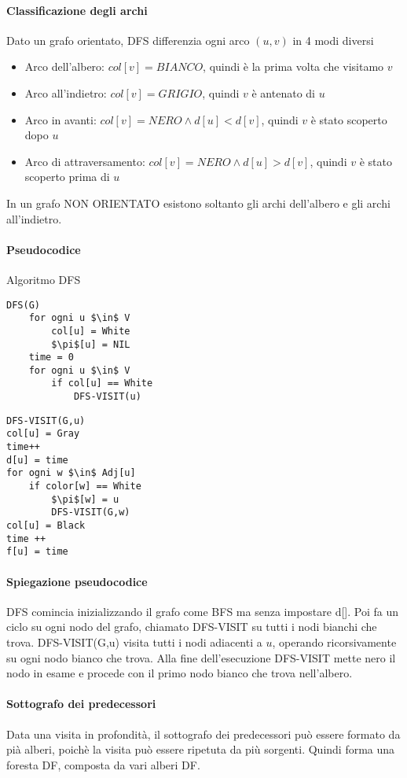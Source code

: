 \documentclass[12pt, a4paper, openany]{book}
\begin{document}
\paragraph{Classificazione degli archi}
Dato un grafo orientato, DFS differenzia ogni arco $(u,v)$ in 4 modi diversi
\begin{itemize}
    \item Arco dell'albero: $col[v] = BIANCO$, quindi è la prima volta che visitamo $v$
    \item Arco all'indietro: $col[v] = GRIGIO$, quindi $v$ è antenato di $u$
    \item Arco in avanti: $col[v] = NERO \land d[u] < d[v]$, quindi $v$ è stato scoperto dopo $u$
    \item Arco di attraversamento: $col[v] = NERO \land d[u] > d[v]$, quindi $v$ è stato scoperto prima di $u$
\end{itemize}
In un grafo NON ORIENTATO esistono soltanto gli archi dell'albero e gli archi all'indietro.

\paragraph{Pseudocodice} Algoritmo DFS
\begin{lstlisting}[mathescape=true]
DFS(G)
    for ogni u $\in$ V
        col[u] = White
        $\pi$[u] = NIL
    time = 0
    for ogni u $\in$ V
        if col[u] == White
            DFS-VISIT(u)
\end{lstlisting}
\begin{lstlisting}[mathescape=true]
DFS-VISIT(G,u)
col[u] = Gray
time++
d[u] = time
for ogni w $\in$ Adj[u]
    if color[w] == White
        $\pi$[w] = u
        DFS-VISIT(G,w)
col[u] = Black
time ++
f[u] = time    
\end{lstlisting}

\paragraph{Spiegazione pseudocodice}
DFS comincia inizializzando il grafo come BFS ma senza impostare d[].
Poi fa un ciclo su ogni nodo del grafo, chiamato DFS-VISIT su tutti i nodi bianchi che trova.
DFS-VISIT(G,u) visita tutti i nodi adiacenti a $u$, operando ricorsivamente su ogni nodo bianco che trova.
Alla fine dell'esecuzione DFS-VISIT mette nero il nodo in esame e procede con il primo nodo bianco che trova nell'albero.


\paragraph{Sottografo dei predecessori}
Data una visita in profondità, il sottografo dei predecessori può essere formato da pià alberi, poichè la visita può essere ripetuta da più sorgenti.
Quindi forma una foresta DF, composta da vari alberi DF.
\end{document}
